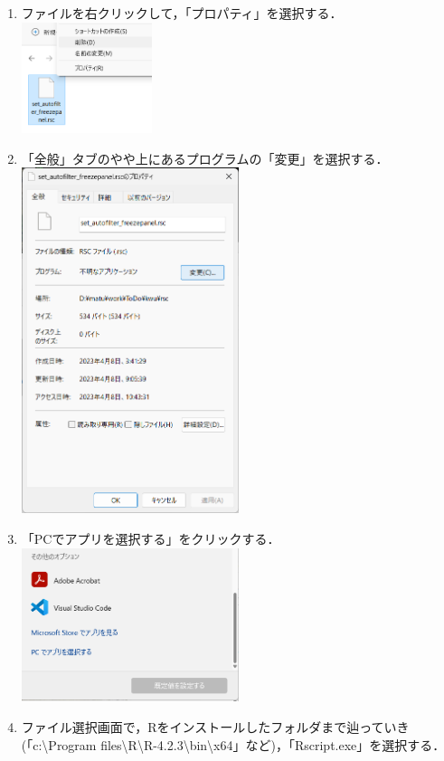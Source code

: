 \documentclass[
]{article}
\begin{document}
\begin{enumerate}
\item
  ファイルを右クリックして，「プロパティ」を選択する．\\
  \includegraphics[width=0.3\textwidth,height=\textheight]{img/assoc_02.png}
\item
  「全般」タブのやや上にあるプログラムの「変更」を選択する．\\
  \includegraphics[width=0.5\textwidth,height=\textheight]{img/assoc_03.png}
\item
  「PCでアプリを選択する」をクリックする．\\
  \includegraphics[width=0.5\textwidth,height=\textheight]{img/assoc_04.png}
\item
  ファイル選択画面で，Rをインストールしたフォルダまで辿っていき(「c:\textbackslash Program files\textbackslash R\textbackslash R-4.2.3\textbackslash bin\textbackslash x64」など)，「Rscript.exe」を選択する．\\

\end{enumerate}
\end{document}
